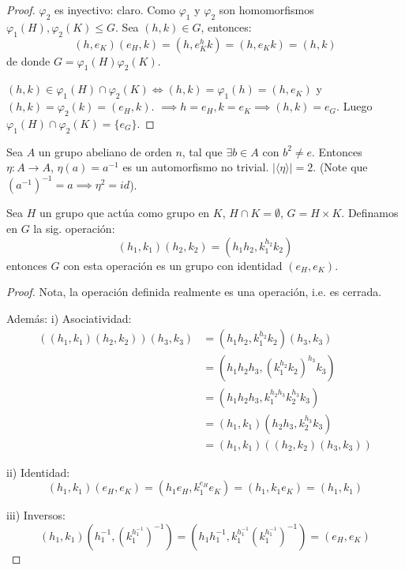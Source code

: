 \begin{proof}
	$\varphi_2$ es inyectivo: claro. Como $\varphi_1$ y $\varphi_2$ son homomorfismos $\varphi_1(H), \varphi_2(K) \le G$.
	Sea $(h, k) \in G$, entonces:
	\begin{equation*}
		(h, e_K)(e_H, k) = (h, e_K^h k) = (h, e_K k) = (h, k)
	\end{equation*}
	de donde $G = \varphi_1(H)\varphi_2(K)$.

	$(h, k) \in \varphi_1(H) \cap \varphi_2(K) \iff (h, k) = \varphi_1(h) = (h, e_K)$ y $(h, k) = \varphi_2(k) = (e_H, k)$.
	$\implies h=e_H, k=e_K \implies (h, k)=e_G$.
	Luego $\varphi_1(H) \cap \varphi_2(K) = \{e_G\}$.
\end{proof}

\begin{eje}
	Sea $A$ un grupo abeliano de orden $n$, tal que $\exists b \in A$ con $b^2 \neq e$.
	Entonces $\eta: A \to A$, $\eta(a) = a^{-1}$ es un automorfismo no trivial.
	$|\langle \eta \rangle| = 2$.
	(Note que $(a^{-1})^{-1} = a \implies \eta^2 = id$).
\end{eje}

\begin{prop}
	Sea $H$ un grupo que actúa como grupo en $K$, $H \cap K = \emptyset$, $G = H \times K$.
	Definamos en $G$ la sig. operación:
	\begin{equation*}
		(h_1, k_1)(h_2, k_2) = (h_1 h_2, k_1^{h_2} k_2)
	\end{equation*}
	entonces $G$ con esta operación es un grupo con identidad $(e_H, e_K)$.
\end{prop}

\begin{proof}
	Nota, la operación definida realmente es una operación, i.e. es cerrada.

	Además:
	i) Asociatividad:
	\begin{align*}
		((h_1, k_1)(h_2, k_2))(h_3, k_3) & = (h_1 h_2, k_1^{h_2} k_2)(h_3, k_3)         \\
		                                 & = (h_1 h_2 h_3, (k_1^{h_2} k_2)^{h_3} k_3)   \\
		                                 & = (h_1 h_2 h_3, k_1^{h_2 h_3} k_2^{h_3} k_3) \\
		                                 & = (h_1, k_1)(h_2 h_3, k_2^{h_3} k_3)         \\
		                                 & = (h_1, k_1)((h_2, k_2)(h_3, k_3))
	\end{align*}


	ii) Identidad:
	\begin{equation*}
		(h_1, k_1)(e_H, e_K) = (h_1 e_H, k_1^{e_H} e_K) = (h_1, k_1 e_K) = (h_1, k_1)
	\end{equation*}


	iii) Inversos:
	\begin{equation*}
		(h_1, k_1)(h_1^{-1}, (k_1^{h_1^{-1}})^{-1}) = (h_1 h_1^{-1}, k_1^{h_1^{-1}} (k_1^{h_1^{-1}})^{-1}) = (e_H, e_K)
	\end{equation*}

\end{proof}

